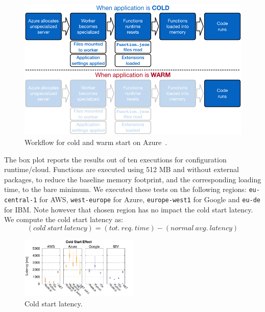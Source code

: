 \begin{figure}[!t]
\centering
\includegraphics[scale=0.6]{bilder/cold-warm}
\caption{Workflow for cold and warm start on Azure~\cite{AzureColdStart}.}
\label{fig:azure_coldstart}
\end{figure}


The box plot reports the results out of ten executions for configuration runtime/cloud. 
Functions are executed using 512 \gls{MB} and without external packages, to reduce the baseline memory footprint, and the corresponding loading time, to the bare minimum.
We executed these tests on the following regions: \texttt{eu-central-1} for AWS,  \texttt{west-europe} for Azure,  \texttt{europe-west1} for Google and \texttt{eu-de} for IBM. 
Note however that chosen region has no impact the cold start latency. 
We compute the cold start latency as:
\begin{equation*}
(cold\ start\ latency) = (tot.\ req.\ time) - (normal\ avg.\ latency)
\end{equation*}

\begin{figure}[!t]
\centering
\includegraphics[width=0.5\textwidth]{bilder/cold_start/coldstart_whisker.pdf}
\caption{Cold start latency.}
\label{fig:coldstart_plot}
\end{figure}



